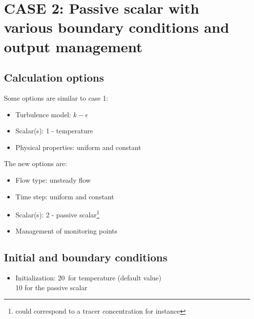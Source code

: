 \section{CASE 2: Passive scalar with various boundary conditions and output management}

        \subsection{Calculation options}

Some options are similar to case 1:
\begin{itemize}
\renewcommand{\labelitemi}{$\rightarrow$}
        \item Turbulence model: $k-\epsilon$
        \item Scalar(s): 1 - temperature
        \item Physical properties: uniform and constant
\end{itemize}

The new options are:
\begin{itemize}
\renewcommand{\labelitemi}{$\rightarrow$}
        \item Flow type: unsteady flow
        \item Time step: uniform and constant
        \item Scalar(s): 2 - passive scalar\footnote{could correspond to a tracer
concentration for instance}
        \item Management of monitoring points
\end{itemize}


        \subsection{Initial and boundary conditions}

\begin{itemize}
\renewcommand{\labelitemi}{$\rightarrow$}
        \item Initialization: 20\degresC\ for temperature (default value) \\
        \hspace*{2.1cm}        10 for the passive scalar
\end{itemize}


